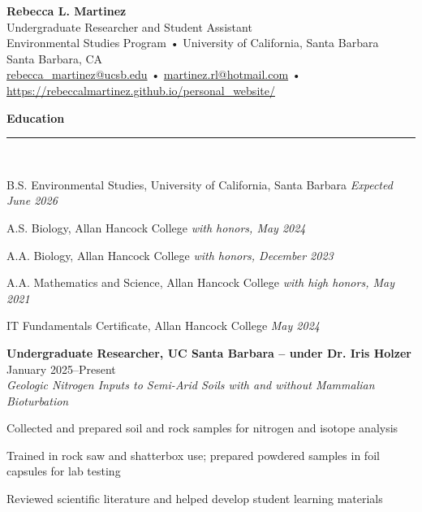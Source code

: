\documentclass[letterpaper]{article}
\newcommand{\sectionheader}[1]{%
  \noindent\textbf{\Large #1}\\[-1.5ex]
  \noindent\rule{\linewidth}{0.4pt}\\[-1.5ex]
}
\renewenvironment{itemize}{
  \begin{list}{}{
    \setlength{\leftmargin}{1.5em}
  }
}{
  \end{list}
}
\begin{document}
\begin{center}
  {\huge \textbf{Rebecca L. Martinez}}\\[0.2cm]
  Undergraduate Researcher and Student Assistant\\
  Environmental Studies Program • University of California, Santa Barbara\\
  Santa Barbara, CA\\[0.2cm]
  \href{mailto:rebecca_martinez@ucsb.edu}{rebecca\_martinez@ucsb.edu} \quad • \quad
  \href{mailto:martinez.rl@hotmail.com}{martinez.rl@hotmail.com} \quad • \quad
  \href{https://rebeccalmartinez.github.io/personal_website/}{https://rebeccalmartinez.github.io/personal_website/}
\end{center}


\vspace{0.1in}


\sectionheader{Education}


\begin{itemize}
  \item B.S. Environmental Studies, University of California, Santa Barbara  
  \emph{Expected June 2026}

  \item A.S. Biology, Allan Hancock College  
  \emph{with honors, May 2024}

  \item A.A. Biology, Allan Hancock College  
  \emph{with honors, December 2023}

  \item A.A. Mathematics and Science, Allan Hancock College  
  \emph{with high honors, May 2021}

  \item IT Fundamentals Certificate, Allan Hancock College  
  \emph{May 2024}
\end{itemize}


\item \textbf{Undergraduate Researcher, UC Santa Barbara – under Dr. Iris Holzer} \hfill January 2025–Present \\
\emph{Geologic Nitrogen Inputs to Semi-Arid Soils with and without Mammalian Bioturbation}

\begin{itemize}
  \item Collected and prepared soil and rock samples for nitrogen and isotope analysis
  \item Trained in rock saw and shatterbox use; prepared powdered samples in foil capsules for lab testing
  \item Reviewed scientific literature and helped develop student learning materials
\end{itemize}
\end{document}
